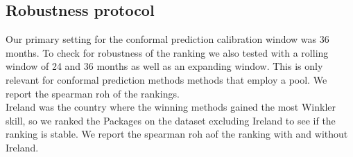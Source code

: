 \subsection{Robustness protocol}
\label{sec:eval:robustness}

Our primary setting for the conformal prediction calibration window was 36 months. To check for robustness of the ranking we also tested with a rolling window of 24 and 36 months as well as an expanding window. This is only relevant for conformal prediction methods methods that employ a pool. We report the spearman roh of the rankings.\\
Ireland was the country where the winning methods gained the most Winkler skill, so we ranked the Packages on the dataset excluding Ireland to see if the ranking is stable. We report the spearman roh aof the ranking with and without Ireland.\\

